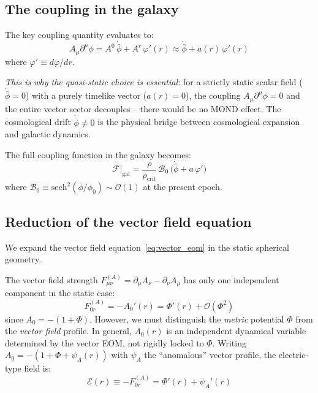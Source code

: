 \documentclass[aps,prd,twocolumn,superscriptaddress,nofootinbib]{revtex4-2}
\begin{document}
\subsection{The coupling in the galaxy}
\label{sec:coupling_galaxy}

The key coupling quantity evaluates to:
\begin{equation}
A_\mu\partial^\mu\phi = A^0\,\dot{\bar{\phi}} + A^r\,\varphi'(r) \approx \dot{\bar{\phi}} + a(r)\,\varphi'(r)
\label{eq:Adphi_galaxy}
\end{equation}
where $\varphi' \equiv d\varphi/dr$.

\textit{This is why the quasi-static choice is essential:} for a strictly static scalar field ($\dot{\bar{\phi}} = 0$) with a purely timelike vector ($a(r) = 0$), the coupling $A_\mu\partial^\mu\phi = 0$ and the entire vector sector decouples -- there would be no MOND effect. The cosmological drift $\dot{\bar{\phi}} \neq 0$ is the physical bridge between cosmological expansion and galactic dynamics.

The full coupling function in the galaxy becomes:
\begin{equation}
\mathcal{F}\big|_{\mathrm{gal}} = \frac{\rho}{\rho_{\mathrm{crit}}}\,\mathcal{B}_0\,\bigl(\dot{\bar{\phi}} + a\,\varphi'\bigr)
\label{eq:F_galaxy}
\end{equation}
where $\mathcal{B}_0 \equiv \mathrm{sech}^2(\bar{\phi}/\phi_0) \sim \mathcal{O}(1)$ at the present epoch.

\subsection{Reduction of the vector field equation}
\label{sec:vector_reduction}

We expand the vector field equation~\eqref{eq:vector_eom} in the static spherical geometry.

The vector field strength $F^{(A)}_{\mu\nu} = \partial_\mu A_\nu - \partial_\nu A_\mu$ has only one independent component in the static case:
\begin{equation}
F^{(A)}_{0r} = -A_0'(r) = \Phi'(r) + \mathcal{O}(\Phi^2)
\label{eq:F0r}
\end{equation}
since $A_0 = -(1+\Phi)$. However, we must distinguish the \textit{metric} potential $\Phi$ from the \textit{vector field} profile. In general, $A_0(r)$ is an independent dynamical variable determined by the vector EOM, not rigidly locked to $\Phi$. Writing $A_0 = -(1 + \Phi + \psi_A(r))$ with $\psi_A$ the ``anomalous'' vector profile, the electric-type field is:
\begin{equation}
\mathcal{E}(r) \equiv -F^{(A)}_{0r} = \Phi'(r) + \psi_A'(r)
\label{eq:E_field}
\end{equation}
\end{document}
